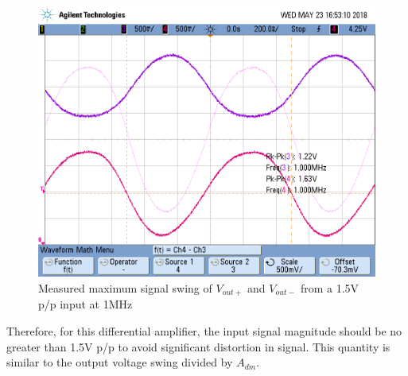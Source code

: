 \FloatBarrier

\begin{figure}[h!]
	\centering
	\includegraphics[scale=0.40]{./images/scope_6}
	\caption{Measured maximum signal swing of $V_{out+}$ and $V_{out-}$ from a 1.5\si{\volt} p/p input at 1MHz}
	\label{fig:scope_6}
\end{figure}

\FloatBarrier

Therefore, for this differential amplifier, the input signal magnitude should be no greater than 1.5V p/p to avoid significant distortion in signal.
This quantity is similar to the output voltage swing divided by $A_{dm}$.
